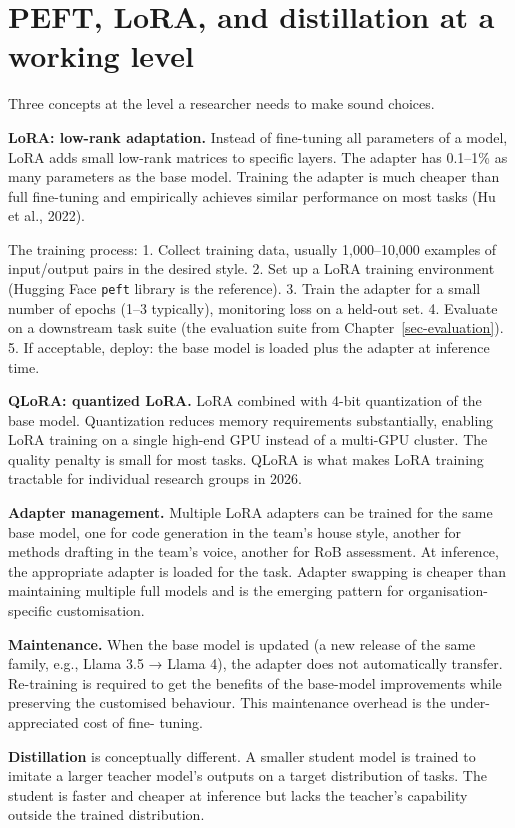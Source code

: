 \documentclass[
  letterpaper,
  11pt]{scrbook}
\begin{document}
\section{PEFT, LoRA, and distillation at a working
level}\label{peft-lora-and-distillation-at-a-working-level}

Three concepts at the level a researcher needs to make sound choices.

\textbf{LoRA: low-rank adaptation.} Instead of fine-tuning all
parameters of a model, LoRA adds small low-rank matrices to specific
layers. The adapter has 0.1--1\% as many parameters as the base model.
Training the adapter is much cheaper than full fine-tuning and
empirically achieves similar performance on most tasks (Hu et al.,
2022).

The training process: 1. Collect training data, usually 1,000--10,000
examples of input/output pairs in the desired style. 2. Set up a LoRA
training environment (Hugging Face \texttt{peft} library is the
reference). 3. Train the adapter for a small number of epochs (1--3
typically), monitoring loss on a held-out set. 4. Evaluate on a
downstream task suite (the evaluation suite from
Chapter~\ref{sec-evaluation}). 5. If acceptable, deploy: the base model
is loaded plus the adapter at inference time.

\textbf{QLoRA: quantized LoRA.} LoRA combined with 4-bit quantization of
the base model. Quantization reduces memory requirements substantially,
enabling LoRA training on a single high-end GPU instead of a multi-GPU
cluster. The quality penalty is small for most tasks. QLoRA is what
makes LoRA training tractable for individual research groups in 2026.

\textbf{Adapter management.} Multiple LoRA adapters can be trained for
the same base model, one for code generation in the team's house style,
another for methods drafting in the team's voice, another for RoB
assessment. At inference, the appropriate adapter is loaded for the
task. Adapter swapping is cheaper than maintaining multiple full models
and is the emerging pattern for organisation-specific customisation.

\textbf{Maintenance.} When the base model is updated (a new release of
the same family, e.g., Llama 3.5 → Llama 4), the adapter does not
automatically transfer. Re-training is required to get the benefits of
the base-model improvements while preserving the customised behaviour.
This maintenance overhead is the under-appreciated cost of fine- tuning.

\textbf{Distillation} is conceptually different. A smaller student model
is trained to imitate a larger teacher model's outputs on a target
distribution of tasks. The student is faster and cheaper at inference
but lacks the teacher's capability outside the trained distribution.
\end{document}
